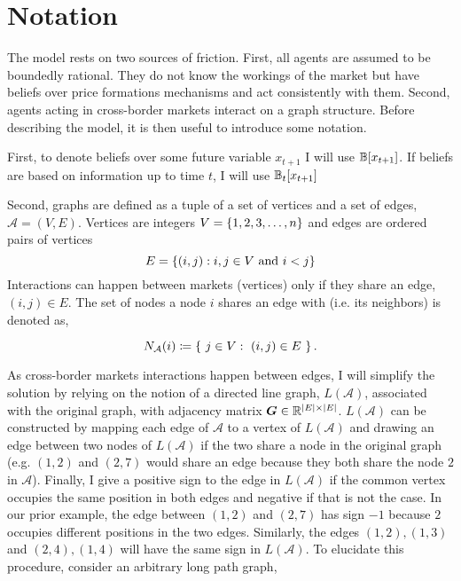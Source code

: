 \section{Notation}
The model rests on two sources of friction. First, all agents are assumed to be boundedly rational. They do not know the workings of the market but have beliefs over price formations mechanisms and act consistently with them. Second, agents acting in cross-border markets interact on a graph structure. Before describing the model, it is then useful to introduce some notation.

First, to denote beliefs over some future variable $x_{t+1}$ I will use $\mathbb{B}[x_{t+1}]$. If beliefs are based on information up to time $t$, I will use $\mathbb{B}_t[x_{t+1}]$

Second, graphs are defined as a tuple of a set of vertices and a set of edges, $\mathcal{A} = (V, E)$. Vertices are integers $V = \left\{1, 2, 3, \ldots, n\right\}$ and edges are ordered pairs of vertices \begin{equation*}E = \left\{(i, j) : i, j \in V \text{ and } i < j\right\}\end{equation*}  Interactions can happen between markets (vertices) only if they share an edge, $(i, j) \in E$. The set of nodes a node $i$ shares an edge with (i.e. its neighbors) is denoted as,

\begin{equation}
  N_{\mathcal{A}}(i) \coloneqq \left\{ \ j \in V: \ (i, j) \in E \ \right\}.
\end{equation}


As cross-border markets interactions happen between edges, I will simplify the solution by relying on the notion of a directed line graph, $L(\mathcal{A})$, associated with the original graph, with adjacency matrix $\bm{G} \in \mathbb{R}^{\lvert E\rvert\times \lvert E\rvert}$. $L(\mathcal{A})$ can be constructed by mapping each edge of $\mathcal{A}$ to a vertex of $L(\mathcal{A})$ and drawing an edge between two nodes of $L(\mathcal{A})$ if the two share a node in the original graph (e.g. $(1, 2)$ and $(2, 7)$ would share an edge because they both share the node $2$ in $\mathcal{A}$). Finally, I give a positive sign to the edge in $L(\mathcal{A})$ if the common vertex occupies the same position in both edges and negative if that is not the case. In our prior example, the edge between $(1, 2)$ and $(2, 7)$ has sign $-1$ because $2$ occupies different positions in the two edges. Similarly, the edges $(1, 2), (1, 3)$ and $(2, 4), (1, 4)$ will have the same sign in $L(\mathcal{A})$. To elucidate this procedure, consider an arbitrary long path graph,

